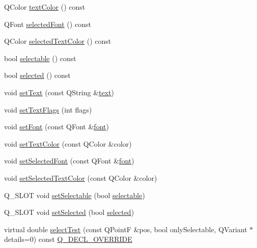 \begin{DoxyCompactItemize}
\item 
Q\+Color \hyperlink{class_q_c_p_text_element_aa610d0b270478e829595b7a89b142e42}{text\+Color} () const 
\item 
Q\+Font \hyperlink{class_q_c_p_text_element_afa816d8b851fb9bcbeb0f643c8338348}{selected\+Font} () const 
\item 
Q\+Color \hyperlink{class_q_c_p_text_element_a419b72712eda4242cd169926440ab6a9}{selected\+Text\+Color} () const 
\item 
bool \hyperlink{class_q_c_p_text_element_ad6f36a709b85638a0e2c005efa4b1049}{selectable} () const 
\item 
bool \hyperlink{class_q_c_p_text_element_a81f68f4628a7e3c4bd22dbcce09740c5}{selected} () const 
\item 
void \hyperlink{class_q_c_p_text_element_ac44b81e69e719b879eb2feecb33557e2}{set\+Text} (const Q\+String \&\hyperlink{class_q_c_p_text_element_a472eed865d08fb01da6b1e917afa0fdb}{text})
\item 
void \hyperlink{class_q_c_p_text_element_ab908f437f552020888a3ad8cf8242605}{set\+Text\+Flags} (int flags)
\item 
void \hyperlink{class_q_c_p_text_element_a09b3241769528fa87cb4bf35c97defad}{set\+Font} (const Q\+Font \&\hyperlink{class_q_c_p_text_element_a8ac43fe9f2f7087f8616c2c92da26250}{font})
\item 
void \hyperlink{class_q_c_p_text_element_a4f3b8361c3ffb3f84346954929ce93ba}{set\+Text\+Color} (const Q\+Color \&color)
\item 
void \hyperlink{class_q_c_p_text_element_a0a2397a3c4ede519e16ab3e991904065}{set\+Selected\+Font} (const Q\+Font \&\hyperlink{class_q_c_p_text_element_a8ac43fe9f2f7087f8616c2c92da26250}{font})
\item 
void \hyperlink{class_q_c_p_text_element_abaec200cae70a0eade53583defc0476d}{set\+Selected\+Text\+Color} (const Q\+Color \&color)
\item 
Q\+\_\+\+S\+L\+OT void \hyperlink{class_q_c_p_text_element_a3c5f9b1897a036b16495ed3fb8371c55}{set\+Selectable} (bool \hyperlink{class_q_c_p_text_element_ad6f36a709b85638a0e2c005efa4b1049}{selectable})
\item 
Q\+\_\+\+S\+L\+OT void \hyperlink{class_q_c_p_text_element_aba5521f9fb22a5f3d2f09ab37d4a1751}{set\+Selected} (bool \hyperlink{class_q_c_p_text_element_a81f68f4628a7e3c4bd22dbcce09740c5}{selected})
\item 
virtual double \hyperlink{class_q_c_p_text_element_a1e721bc2994a127ef5a8f0a514a5dbac}{select\+Test} (const Q\+PointF \&pos, bool only\+Selectable, Q\+Variant $\ast$details=0) const \hyperlink{qcustomplot_8hh_a42cc5eaeb25b85f8b52d2a4b94c56f55}{Q\+\_\+\+D\+E\+C\+L\+\_\+\+O\+V\+E\+R\+R\+I\+DE}

\end{DoxyCompactItemize}
